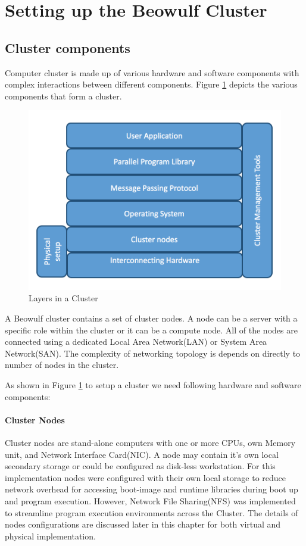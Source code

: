 \section{Setting up the Beowulf Cluster}
\label{beowulf_setup}
\subsection{Cluster components}
Computer cluster is made up of various hardware and software components with complex interactions between different components. Figure \ref{fig:cluster-layers} depicts the various components that form a cluster.

\begin{figure}[!htb]
 \center
  \includegraphics[width= .75 \linewidth]{figs/cluster/cluster_layers.png}
  \caption{Layers in a Cluster}
  \label{fig:cluster-layers}
   \center
\end{figure}

A Beowulf cluster contains a set of cluster nodes. A node can be a server with a specific role within the cluster or it can be a compute node. All of the nodes are connected using a dedicated Local Area Network(LAN) or System Area Network(SAN). The complexity of networking topology is depends on directly to number of nodes in the cluster.

As shown in Figure \ref{fig:cluster-layers} to setup a cluster we need following hardware and software components:

\paragraph{Cluster Nodes}
Cluster nodes are stand-alone computers with one or more CPUs, own Memory unit, and Network Interface Card(NIC). A node may contain it's own local secondary storage or could be configured as disk-less workstation. For this implementation nodes were configured with their own local storage to reduce network overhead for accessing boot-image and runtime libraries during boot up and program execution. However, Network File Sharing(NFS) was implemented to streamline program execution environments across the Cluster. The details of nodes configurations are discussed later in this chapter for both virtual and physical implementation.

